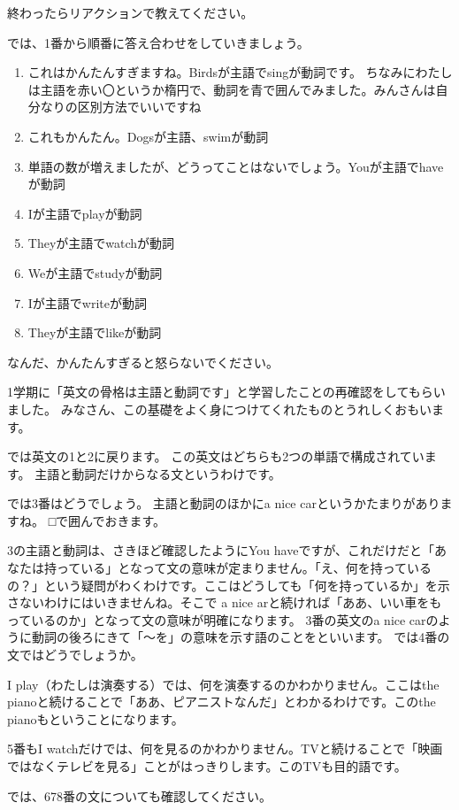 \documentclass[book,jafontscale=0.9247]{jlreq}
\begin{document}
終わったらリアクションで教えてください。

では、1番から順番に答え合わせをしていきましょう。

\begin{enumerate}
 \item これはかんたんすぎますね。Birdsが主語でsingが動詞です。
ちなみにわたしは主語を赤い〇というか楕円で、動詞を青で囲んでみました。みんさんは自分なりの区別方法でいいですね
 \item これもかんたん。Dogsが主語、swimが動詞
 \item 単語の数が増えましたが、どうってことはないでしょう。Youが主語でhaveが動詞
 \item Iが主語でplayが動詞
 \item Theyが主語でwatchが動詞
 \item Weが主語でstudyが動詞
 \item Iが主語でwriteが動詞
 \item Theyが主語でlikeが動詞
\end{enumerate}

なんだ、かんたんすぎると怒らないでください。

1学期に「英文の骨格は主語と動詞です」と学習したことの再確認をしてもらいました。
みなさん、この基礎をよく身につけてくれたものとうれしくおもいます。

では英文の1と2に戻ります。
この英文はどちらも2つの単語で構成されています。
主語と動詞だけからなる文というわけです。

では3番はどうでしょう。
主語と動詞のほかにa nice carというかたまりがありますね。
□で囲んでおきます。

3の主語と動詞は、さきほど確認したようにYou haveですが、これだけだと「あなたは持っている」となって文の意味が定まりません。「え、何を持っているの？」という疑問がわくわけです。ここはどうしても「何を持っているか」を示さないわけにはいきませんね。そこで a nice arと続ければ「ああ、いい車をもっているのか」となって文の意味が明確になります。
3番の英文のa nice carのように動詞の後ろにきて「～を」の意味を示す語のことをといいます。
では4番の文ではどうでしょうか。

I play（わたしは演奏する）では、何を演奏するのかわかりません。ここはthe pianoと続けることで「ああ、ピアニストなんだ」とわかるわけです。このthe pianoもということになります。

5番もI watchだけでは、何を見るのかわかりません。TVと続けることで「映画ではなくテレビを見る」ことがはっきりします。このTVも目的語です。

では、678番の文についても確認してください。
\end{document}
